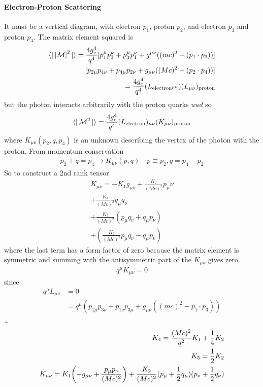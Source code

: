 \documentclass[../main.tex]{subfiles}
\begin{document}
\paragraph*{Electron-Proton Scattering} It must be a vertical diagram, with electron $p_1$, proton
$p_2$, and electron $p_3$ and proton $p_4$. The matrix element squared is
\begin{align*}
    \bra{} \abs{\mathcal{M}}^2 \ket{}= \frac{4g_e^4}{q^4} [p_1^\mu p_3^\nu + p_3^\mu p_1^\nu + g^{\mu\nu} ((mc)^2 - (p_1 \cdot p_3))] \\
    [p_{2\mu} p_{4\nu} + p_{4\mu} p_{2\nu} + g_{\mu\nu} ((Mc)^2 - (p_2 \cdot p_4))] \\
    = \frac{4g_e^4}{q^4} (L_{\text{electron}^{\mu\nu}})(L_{\mu\nu})_{\text{proton}}
\end{align*}
but the photon interacts arbitrarily with the proton quarks $uud$ so 
\begin{align*}
    \bra{}{\mathcal{M}^2}\ket{} = \frac{4g_e^4}{q^4}  (L_{\text{electron}})_{\mu\nu} (K_{\mu\nu})_{\text{proton}}
\end{align*}
where $K_{\mu\nu} (p_2, q, p_4)$ is an unknown describing the vertex of the photon with the proton.
From momentum conservation
\begin{align*}
    p_2 + q = p_4 \to K_{\mu\nu} (p, q) \quad p \equiv p_2, q = p_4 - p_2
\end{align*}
So to construct a 2nd rank tensor
\begin{align*}
    K_{\mu\nu} = -K_1 g_{\mu\nu} +  \frac{K_2}{(Mc)^2} p_\mu\nu \\
    + \frac{K_4}{(Mc)^2} q_\mu q_\nu \\
    + \frac{K_5}{(Mc)^2} (p_\mu q_\nu + q_\mu p_\nu) \\
    + (\frac{K_6}{(Mc)^2} p_\mu q_\nu - q_\mu p_\nu)
\end{align*}
where the last term has a form factor of zero because the matrix element is symmetric and summing 
with the antisymmetric part of the $K_{\mu\nu}$ gives zero. 
\begin{align*}
    q^\mu K_{\mu\nu} = 0 
\end{align*}
since
\begin{align*}
    q^\mu L_{\mu\nu} &= 0 \\
    &= q^\mu (p_{1\mu} p_{3\nu} + p_{1\nu} p_{3\mu} + g_{\mu\nu} ((mc)^2 - p_1 \cdot p_3)) 
\end{align*}
\dots
\begin{align*}
    K_4 = \frac{(Mc)^2}{q^2} K_1 + \frac{1}{4} K_2 \\
    K_5 = \frac{1}{2} K_2 \\
    K_{\mu\nu} = K_1 \qt(-g_{\mu\nu} + \frac{p_\mu p_\nu}{(Mc)^2}) + \frac{K_2}{(Mc)^2} (p_\mu + \frac{1}{2} q_\mu) (p_\nu + \frac{1}{2} q_\nu)
\end{align*}
\end{document}
